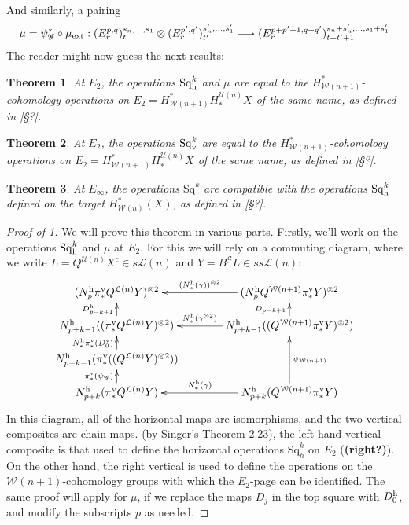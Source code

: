 \documentclass[11pt]{amsart}
\theoremstyle{plain}
\newtheorem{thm}{Theorem}[section]
\theoremstyle{definition}
\renewcommand{\to}{\longrightarrow}
\newcommand{\scrQ}{\mathscr{Q}}
\newcommand{\scrR}{\mathscr{R}}
\newcommand{\scrT}{\mathscr{T}}
\newcommand{\scrY}{\mathscr{Y}}
\newcommand{\scrI}{\mathscr{I}}
\newcommand{\scrO}{\mathscr{O}}
\newcommand{\scrP}{\mathscr{P}}
\newcommand{\scrS}{\mathscr{S}}
\newcommand{\scrG}{\mathscr{G}}
\newcommand{\scrH}{\mathscr{H}}
\newcommand{\scrJ}{\mathscr{J}}
\newcommand{\scrK}{\mathscr{K}}
\newcommand{\scrL}{\mathscr{L}}
\newcommand{\scrZ}{\mathscr{Z}}
\newcommand{\scrN}{\mathscr{N}}
\newcommand{\scrM}{\mathscr{M}}
\newcommand{\calW}{\mathcal{W}}
\newcommand{\calU}{\mathcal{U}}
\newcommand{\calL}{\mathcal{L}}
\theoremstyle{plain}
\newcommand{\BSW}{{\scrG}}%
\newcommand{\BSWres}{B^\BSW}%
\newcommand{\ExtCohProd}{\mu_\textup{ext}}
\newcommand{\Sq}{\mathrm{Sq}}
\begin{document}
\begin{Composite functor spectral sequences}
And similarly, a pairing
\[\mu=\psi_{\BSW}^*\circ\ExtCohProd:(E^{p,q}_r)^{s_n,\ldots,s_1}_t\otimes (E^{p',q'}_r)^{s'_n,\ldots,s'_1}_{t'}\to (E^{p+p'+1,q+q'}_r)^{s_n+s'_n,\ldots,s_1+s'_1}_{t+t'+1}\]
The reader might now guess the next results:
\begin{thm}\label{E2CompFuncLieOperationsID}
At $E_2$, the operations $\Sq_\textup{h}^k$ and $\mu$ are equal to the $H^*_{\calW(n+1)}$-cohomology operations on $E_2=H^*_{\calW(n+1)}H_*^{\calU(n)}X$ of the same name, as defined in [\S?].
\end{thm}
\begin{thm}\label{E2CompFuncKosOperationsID}
At $E_2$, the operations $\Sq_\textup{v}^k$ are equal to the $H^*_{\calW(n+1)}$-cohomology operations on $E_2=H^*_{\calW(n+1)}H_*^{\calU(n)}X$ of the same name, as defined in [\S?].
\end{thm}
\begin{thm}\label{EInftyCompFuncOperationsID}
At $E_\infty$, the operations $\Sq^k$ are compatible with the operations $\Sq^k_\textup{h}$ defined on the target $H^*_{\calW(n)}(X)$, as defined in [\S?].
\end{thm} 
\begin{tricky proofs of operation compatibilities}
\begin{proof}[Proof of \ref{E2CompFuncLieOperationsID}]
We will prove this theorem in various parts. Firstly, we'll work on the operations $\Sq_\textup{h}^k$ and $\mu$ at $E_2$.
For this we will rely on a commuting diagram, where we write $L=Q^{\calU(n)}X^c\in s\calL(n)$ and $Y=\BSWres L\in ss\calL(n)$:
\[\xymatrix@C=13mm@R=4mm{
(N_p^\textup{h}\pi_*^{\textup{v}}Q^{\calL(n)}Y)^{\otimes2}&%
(N_p^\textup{h}Q^{\calW(n+1)}\pi_*^{\textup{v}}Y)^{\otimes2}
\ar[l]_-{(N^\textup{h}_*(\gamma))^{\otimes 2}}
\\%
N_{p+k-1}^\textup{h}((\pi_*^{\textup{v}}Q^{\calL(n)}Y)^{\otimes2})
\ar[u]^-{D_{p-k+1}^\textup{h}}
&%
N_{p+k-1}^\textup{h}((Q^{\calW(n+1)}\pi_*^{\textup{v}}Y)^{\otimes2})
\ar[u]^-{D_{p-k+1}}
\ar[l]_-{N^\textup{h}_*(\gamma^{\otimes 2})}
\\%
N_{p+k-1}^\textup{h}(\pi_*^{\textup{v}}((Q^{\calL(n)}Y)^{\otimes2}))
\ar[u]^-{N^\textup{h}_*\pi_*^\textup{v}(D_0^\textup{v})}
&%
\\%
N^\textup{h}_{p+k}(\pi_*^{\textup{v}} Q^{\calL(n)}Y)
\ar[u]^-{\pi_*^\textup{v}(\psi_{\BSW})}
&%
N^\textup{h}_{p+k}(Q^{\calW(n+1)}\pi_*^{\textup{v}} Y)
\ar[uu]_-{\psi_{\calW(n+1)}}
\ar[l]_-{N^\textup{h}_*(\gamma)}
}\]
In this diagram, all of the horizontal maps are isomorphisms, and the two vertical composites are chain maps. (by Singer's Theorem 2.23),  the left hand vertical composite is that used to define the horizontal operations $\Sq^{k}_h$ on $E_2$ (\textbf{(right?)}). On the other hand, the right vertical is used to define the operations on the $\calW(n+1)$-cohomology groups with which the $E_2$-page can be identified. The same proof will apply for $\mu$, if we replace the maps $D_j$ in the top square with $D_0^\textup{h}$, and modify the subscripts $p$ as needed.


\end{proof}
\end{tricky proofs of operation compatibilities}
\end{Composite functor spectral sequences}
\end{document}
